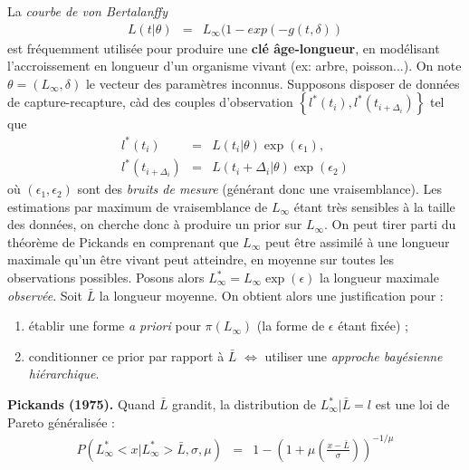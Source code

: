 \begin{exo}
La \emph{courbe de von Bertalanffy} 
\begin{eqnarray*}
L(t|\theta) & = & L_{\infty}(1 - exp(-g(t,\delta)) 
\end{eqnarray*}
est fréquemment utilisée pour produire une {\bf clé \^age-longueur}, en modélisant l'accroissement en longueur d'un organisme vivant (ex: arbre, poisson...). On note $\theta=(L_{\infty},\delta)$ le vecteur des paramètres inconnus. Supposons disposer de données de capture-recapture, càd des couples d'observation $\left\{l^*(t_i),l^*(t_{i+\Delta_i})\right\}$ tel que
\begin{eqnarray*}
l^*(t_i) & = & L(t_i|\theta)\exp(\epsilon_1), \\
l^*(t_{i+\Delta_i}) & = & L(t_i+\Delta_i|\theta)\exp(\epsilon_2)
\end{eqnarray*}
où $(\epsilon_1,\epsilon_2)$ sont des \emph{bruits de mesure} (générant donc une vraisemblance). Les estimations par maximum de vraisemblance de  $L_{\infty}$ étant très sensibles à la taille des données, on cherche donc à produire un prior sur  $L_{\infty}$. On peut tirer parti du théorème de Pickands en comprenant que $L_{\infty}$ peut être assimilé à une longueur maximale qu'un être vivant peut atteindre, en moyenne sur toutes les observations possibles. Posons alors $L^*_{\infty} = L_{\infty}\exp(\epsilon)$ la longueur maximale {\it observée}. Soit $\bar{L}$ la longueur moyenne.  On obtient alors une justification pour :
\begin{enumerate}
\item établir une forme {\it a priori} pour $\pi(L_{\infty})$ (la forme de $\epsilon$ étant fixée) ; 
\item conditionner ce prior par rapport à $\bar{L}$ $\Leftrightarrow$ utiliser une \emph{approche bayésienne hiérarchique}. 
\end{enumerate}  
\end{exo}

\begin{theorem}{\bf Pickands (1975).} 
Quand $\bar{L}$ grandit, la distribution de $L^*_{\infty}|\bar{L}=l$ est une loi de Pareto généralisée :
\begin{eqnarray*}
P\left(L^*_{\infty}<x|L^*_{\infty}>\bar{L},\sigma,\mu\right) & = & 1 - \left( 1 + \mu\left(\frac{x-\bar{L}}{\sigma}\right)\right)^{-1/\mu} 
\end{eqnarray*}
\end{theorem}

